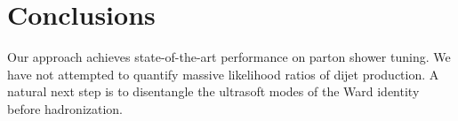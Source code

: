 \section{Conclusions}\label{sec:conclusions}

Our approach achieves state-of-the-art performance on parton shower
tuning. We have not attempted to quantify massive likelihood ratios of
dijet production. A natural next step is to disentangle the ultrasoft
modes of the Ward identity before hadronization.


